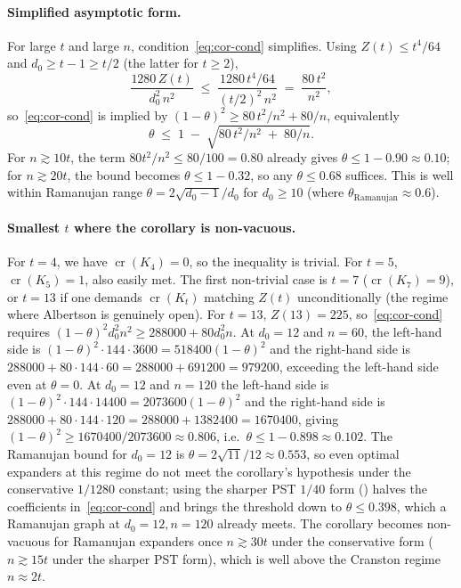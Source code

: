 \documentclass[11pt,a4paper]{article}
\theoremstyle{definition}
\DeclareMathOperator{\crN}{cr}
\begin{document}
\paragraph{Simplified asymptotic form.}
For large $t$ and large $n$, condition~\eqref{eq:cor-cond}
simplifies. Using $Z(t) \le t^{4}/64$ and $d_0 \ge t - 1 \ge t/2$
(the latter for $t \ge 2$),
\[
   \frac{1280\,Z(t)}{d_0^{2}\,n^{2}} \;\le\; \frac{1280\,t^{4}/64}{(t/2)^{2}\,n^{2}}
                                 \;=\; \frac{80\,t^{2}}{n^{2}},
\]
so~\eqref{eq:cor-cond} is implied by
$(1 - \theta)^{2} \ge 80\,t^{2}/n^{2} + 80/n$, equivalently
\begin{equation}\label{eq:cor-asymp}
   \theta \;\le\; 1 \;-\; \sqrt{80\,t^{2}/n^{2} \;+\; 80/n}.
\end{equation}
For $n \gtrsim 10 t$, the term $80 t^{2}/n^{2} \le 80/100 = 0.80$
already gives $\theta \le 1 - 0.90 \approx 0.10$; for $n \gtrsim
20 t$, the bound becomes $\theta \le 1 - 0.32$, so any
$\theta \le 0.68$ suffices. This is well within Ramanujan range
$\theta = 2\sqrt{d_0 - 1}/d_0$ for $d_0 \ge 10$ (where
$\theta_{\text{Ramanujan}} \approx 0.6$).

\paragraph{Smallest $t$ where the corollary is non-vacuous.}
For $t = 4$, we have $\crN(K_4) = 0$, so the inequality is
trivial. For $t = 5$, $\crN(K_5) = 1$, also easily met. The
first non-trivial case is $t = 7$ ($\crN(K_7) = 9$), or
$t = 13$ if one demands $\crN(K_t)$ matching $Z(t)$ unconditionally
(the regime where Albertson is genuinely open). For
$t = 13$, $Z(13) = 225$, so~\eqref{eq:cor-cond} requires
$(1 - \theta)^{2} d_0^{2} n^{2} \ge 288000 + 80 d_0^{2} n$. At
$d_0 = 12$ and $n = 60$, the left-hand side is
$(1 - \theta)^{2} \cdot 144 \cdot 3600 = 518400 (1 - \theta)^{2}$
and the right-hand side is $288000 + 80 \cdot 144 \cdot 60
= 288000 + 691200 = 979200$, exceeding the left-hand side
even at $\theta = 0$. At $d_0 = 12$ and $n = 120$ the
left-hand side is $(1 - \theta)^{2} \cdot 144 \cdot 14400
= 2073600 (1 - \theta)^{2}$ and the right-hand side is
$288000 + 80 \cdot 144 \cdot 120 = 288000 + 1382400 = 1670400$,
giving $(1 - \theta)^{2} \ge 1670400 / 2073600 \approx 0.806$,
i.e.\ $\theta \le 1 - 0.898 \approx 0.102$. The Ramanujan bound
for $d_0 = 12$ is $\theta = 2\sqrt{11}/12 \approx 0.553$, so
even optimal expanders at this regime do not meet the corollary's
hypothesis under the conservative $1/1280$ constant; using the
sharper PST $1/40$ form () halves the
coefficients in~\eqref{eq:cor-cond} and brings the threshold
down to $\theta \le 0.398$, which a Ramanujan graph at
$d_0 = 12, n = 120$ already meets.
The corollary becomes non-vacuous for Ramanujan
expanders once $n \gtrsim 30 t$ under the conservative form
($n \gtrsim 15 t$ under the sharper PST form), which is well
above the Cranston regime $n \approx 2 t$.
\end{document}

